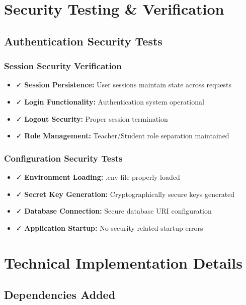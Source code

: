 \documentclass[12pt,a4paper]{article}
\begin{document}
\section{Security Testing \& Verification}

\subsection{Authentication Security Tests}

\subsubsection{Session Security Verification}
\begin{itemize}
    \item ✓ \textbf{Session Persistence:} User sessions maintain state across requests
    \item ✓ \textbf{Login Functionality:} Authentication system operational
    \item ✓ \textbf{Logout Security:} Proper session termination
    \item ✓ \textbf{Role Management:} Teacher/Student role separation maintained
\end{itemize}

\subsubsection{Configuration Security Tests}
\begin{itemize}
    \item ✓ \textbf{Environment Loading:} .env file properly loaded
    \item ✓ \textbf{Secret Key Generation:} Cryptographically secure keys generated
    \item ✓ \textbf{Database Connection:} Secure database URI configuration
    \item ✓ \textbf{Application Startup:} No security-related startup errors
\end{itemize}

\section{Technical Implementation Details}

\subsection{Dependencies Added}
\end{document}
